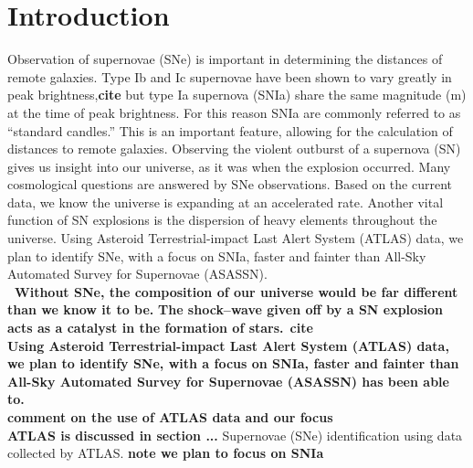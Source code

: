 \documentclass[aps,prb,twocolumn,superscriptaddress]{revtex4-1}
\begin{document}
\maketitle    



\section{Introduction}
Observation of supernovae (SNe) is important in determining the distances 
of remote galaxies.  
Type Ib and Ic supernovae have been shown to vary greatly in peak brightness,{\bf cite} 
but type Ia supernova (SNIa) share the same magnitude (m) at the time of peak brightness.  
For this reason SNIa are commonly referred to as ``standard candles.''  This is 
an important feature, allowing for the calculation of distances to remote galaxies.  
Observing the violent outburst of a supernova (SN) gives us insight into our universe, 
as it was when the explosion occurred.  
Many cosmological questions are answered by SNe observations.  Based on the current 
data, we know the universe is expanding at an accelerated rate.  Another vital 
function of SN explosions is the dispersion of heavy elements throughout the universe.  
Using Asteroid Terrestrial-impact Last Alert System (ATLAS) data, we plan to identify 
SNe, with a focus on SNIa, faster and fainter than All-Sky Automated Survey for Supernovae 
(ASASSN).
{\bf ~\\~Without SNe, the composition of our universe would be far different than we know it to be.}
{\bf The shock--wave given off by a SN explosion acts as a catalyst in the formation of stars.}~{\bf cite}\\

{\bf Using Asteroid Terrestrial-impact Last Alert System (ATLAS) data, we plan to identify 
SNe, with a focus on SNIa, faster and fainter than All-Sky Automated Survey for Supernovae (ASASSN) 
has been able to.}\\


{\bf comment on the use of ATLAS data and our focus\\ATLAS is discussed in section ...}
Supernovae (SNe) identification using data collected by ATLAS.
{\bf note we plan to focus on SNIa}


\end{document}
